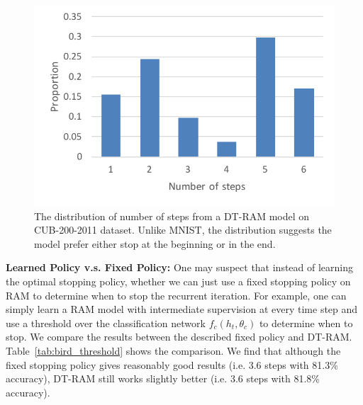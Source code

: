 \documentclass[10pt,twocolumn,letterpaper]{article}
\begin{document}
\setlength{\tabcolsep}{1pt}
\begin{figure}
\begin{center}
    \includegraphics[width=0.95\linewidth]{figs/exp/bird_distribution.pdf}
\end{center}
\vspace{-20pt}
\caption{The distribution of number of steps from a DT-RAM model on CUB-200-2011 dataset. Unlike MNIST, the distribution suggests the model prefer either stop at the beginning or in the end.}
\label{fig:bird_distribution}
\end{figure}

\textbf{Learned Policy v.s. Fixed Policy:} One may suspect that instead of learning the optimal stopping policy, whether we can just use a fixed stopping policy on RAM to determine when to stop the recurrent iteration.
For example, one can simply learn a RAM model with intermediate supervision at every time step and use a threshold over the classification network $f_c(h_t, \theta_c)$ to determine when to stop.
We compare the results between the described fixed policy and DT-RAM.
Table~\ref{tab:bird_threshold} shows the comparison.
We find that although the fixed stopping policy gives reasonably good results (i.e. 3.6 steps with 81.3\% accuracy), DT-RAM still works slightly better (i.e. 3.6 steps with 81.8\% accuracy).
\end{document}
